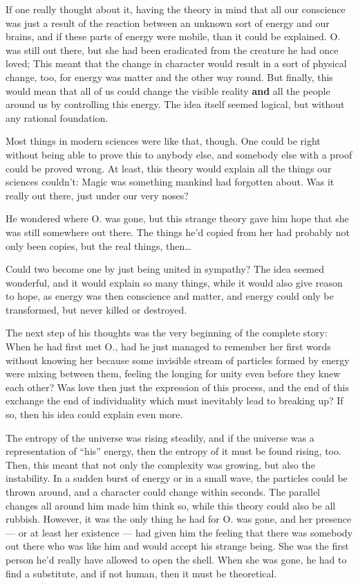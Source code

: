 If one really thought about it, having the theory in mind that all our conscience was just a result of the reaction between an unknown sort of energy and our brains, and if these parts of energy were mobile, than it could be explained. O. was still out there, but she had been eradicated from the creature he had once loved; This meant that the change in character would result in a sort of physical change, too, for energy was matter and the other way round. But finally, this would mean that all of us could change the visible reality \textbf{and} all the people around us by controlling this energy. The idea itself seemed logical, but without any rational foundation.

Most things in modern sciences were like that, though. One could be right without being able to prove this to anybody else, and somebody else with a proof could be proved wrong. 
At least, this theory would explain all the things our sciences couldn't: Magic was something mankind had forgotten about. Was it really out there, just under our very noses?

He wondered where O. was gone, but this strange theory gave him hope that she was still somewhere out there. The things he'd copied from her had probably not only been copies, but the real things, then\ldots

Could two become one by just being united in sympathy? The idea seemed wonderful, and it would explain so many things, while it would also give reason to hope, as energy was then conscience and matter, and energy could only be transformed, but never killed or destroyed.

The next step of his thoughts was the very beginning of the complete story: When he had first met O., had he just managed to remember her first words without knowing her because some invisible stream of particles formed by energy were mixing between them, feeling the longing for unity even before they knew each other? Was love then just the expression of this process, and the end of this exchange the end of individuality which must inevitably lead to breaking up? If so, then his idea could explain even more.

The entropy of the universe was rising steadily, and if the universe was a representation of \enquote{his} energy, then the entropy of it must be found rising, too. Then, this meant that not only the complexity was growing, but also the instability. In a sudden burst of energy or in a small wave, the particles could be thrown around, and a character could change within seconds. The parallel changes all around him made him think so, while this theory could also be all rubbish. However, it was the only thing he had for O. was gone, and her presence --- or at least her existence --- had given him the feeling that there was somebody out there who was like him and would accept his strange being. She was the first person he'd really have allowed to open the shell. When she was gone, he had to find a substitute, and if not human, then it must be theoretical.

